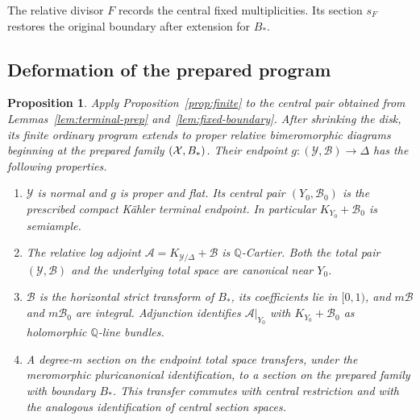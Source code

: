 \documentclass[11pt,a4paper]{article}
\numberwithin{equation}{section}
\newtheorem{proposition}[theorem]{Proposition}
\theoremstyle{definition}
\theoremstyle{remark}
\newcommand{\Q}{\mathbb Q}\newcommand{\R}{\mathbb R}
\newcommand{\cY}{\mathcal Y}\newcommand{\cB}{\mathcal B}
\newcommand{\cA}{\mathcal A}\newcommand{\cF}{\mathcal F}
\begin{document}
The relative divisor $F$ records the central fixed multiplicities.
Its section $s_F$ restores the original boundary after extension
for $B_*$.

\subsection{Deformation of the prepared program}

\begin{proposition}\label{prop:relative-program}
Apply Proposition~\ref{prop:finite} to the central pair obtained from
Lemmas~\ref{lem:terminal-prep} and~\ref{lem:fixed-boundary}.
After shrinking the disk, its finite ordinary program extends to
proper relative bimeromorphic diagrams beginning at the prepared
family $(\mathcal X,B_*)$. Their endpoint
$g:(\cY,\cB)\to\Delta$ has the following properties.
\begin{enumerate}[label=\textup{(\roman*)},leftmargin=*]
\item $\cY$ is normal and $g$ is proper and flat. Its central pair
$(Y_0,\cB_0)$ is the prescribed compact Kähler terminal endpoint.
In particular $K_{Y_0}+\cB_0$ is semiample.
\item The relative log adjoint
$\cA=K_{\cY/\Delta}+\cB$ is $\Q$-Cartier. Both the total pair
$(\cY,\cB)$ and the underlying total space are canonical near $Y_0$.
\item $\cB$ is the horizontal strict transform of $B_*$, its
coefficients lie in $[0,1)$, and $m\cB$ and $m\cB_0$ are integral.
Adjunction identifies $\cA|_{Y_0}$ with
$K_{Y_0}+\cB_0$ as holomorphic $\Q$-line bundles.
\item A degree-$m$ section on the endpoint total space transfers,
under the meromorphic pluricanonical identification, to a section
on the prepared family with boundary $B_*$. This transfer commutes
with central restriction and with the analogous identification of
central section spaces.
\end{enumerate}
\end{proposition}
\end{document}
